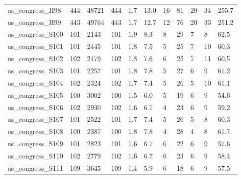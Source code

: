 \begin{longtable}{lllllllllll}
 us\_congress\_H98                                    & 444        & 48721     & 444   & 1.7    & 13.0   & 16    & 81     & 20     & 34     & 255.7   \\
 us\_congress\_H99                                    & 443        & 49764     & 443   & 1.7    & 12.7   & 12    & 76     & 20     & 33     & 251.2   \\
 us\_congress\_S100                                   & 101        & 2143      & 101   & 1.9    & 8.3    & 8     & 29     & 7      & 8      & 62.5    \\
 us\_congress\_S101                                   & 101        & 2445      & 101   & 1.8    & 7.5    & 5     & 25     & 7      & 10     & 60.3    \\
 us\_congress\_S102                                   & 102        & 2479      & 102   & 1.8    & 7.6    & 6     & 25     & 7      & 11     & 60.5    \\
 us\_congress\_S103                                   & 101        & 2257      & 101   & 1.8    & 7.8    & 5     & 27     & 6      & 9      & 61.2    \\
 us\_congress\_S104                                   & 102        & 2324      & 102   & 1.7    & 7.4    & 5     & 26     & 5      & 10     & 61.1    \\
 us\_congress\_S105                                   & 100        & 3002      & 100   & 1.5    & 6.0    & 5     & 19     & 6      & 9      & 54.6    \\
 us\_congress\_S106                                   & 102        & 2930      & 102   & 1.6    & 6.7    & 4     & 23     & 6      & 9      & 59.2    \\
 us\_congress\_S107                                   & 101        & 2522      & 101   & 1.7    & 7.4    & 5     & 26     & 5      & 8      & 60.3    \\
 us\_congress\_S108                                   & 100        & 2387      & 100   & 1.8    & 7.8    & 4     & 28     & 4      & 8      & 61.7    \\
 us\_congress\_S109                                   & 101        & 2823      & 101   & 1.6    & 6.7    & 6     & 22     & 6      & 9      & 57.6    \\
 us\_congress\_S110                                   & 102        & 2779      & 102   & 1.6    & 6.7    & 6     & 23     & 6      & 9      & 58.4    \\
 us\_congress\_S111                                   & 109        & 3645      & 109   & 1.4    & 5.9    & 6     & 18     & 6      & 9      & 57.5    \\

\end{longtable}
